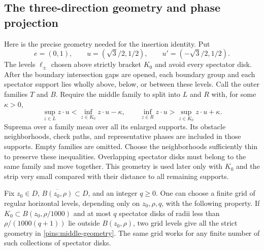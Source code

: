 \subsection{The three-direction geometry and phase projection}

Here is the precise geometry needed for the insertion identity.  Put
\begin{equation}\label{pins:three-normals}
 e=(0,1),\qquad u=(\sqrt3/2,1/2),\qquad
 u'=(-\sqrt3/2,1/2).
\end{equation}
The levels $\ell_\pm$ chosen above strictly bracket $K_0$ and avoid
every spectator disk.  After the boundary intersection gaps are opened,
each boundary group and each spectator support lies wholly above,
below, or between these levels.  Call the outer families $T$ and $B$.
Require the middle family to split into $L$ and $R$ with, for some
$\kappa>0$,
\begin{equation}\label{pins:middle-geometry}
 \sup_{z\in L}z\cdot u<\inf_{z\in K_0}z\cdot u-\kappa,
 \qquad
 \inf_{z\in R}z\cdot u>\sup_{z\in K_0}z\cdot u+\kappa.
\end{equation}
Suprema over a family mean over all its enlarged supports.  Its
obstacle neighborhoods, check paths, and representative phases are
included in those supports.  Empty families are omitted.  Choose the
neighborhoods sufficiently thin to preserve these inequalities.
Overlapping spectator disks must belong to the same family and move
together.  This geometry is used later only with $K_0$ and the strip
very small compared with their distance to all remaining supports.

\begin{lemma}\label{pins:local-geometry}
Fix $z_0\in D$, $\overline{B(z_0,\rho)}\subset D$, and an integer
$q\ge0$.  One can choose a finite grid of regular horizontal levels,
depending only on $z_0,\rho,q$, with the following property.  If
$K_0\subset B(z_0,\rho/1000)$ and at most $q$ spectator disks of
radii less than $\rho/(1000(q+1))$ lie outside $B(z_0,\rho)$, two
grid levels give all the strict geometry in
\eqref{pins:middle-geometry}.  The same grid works for any finite
number of such collections of spectator disks.
\end{lemma}

